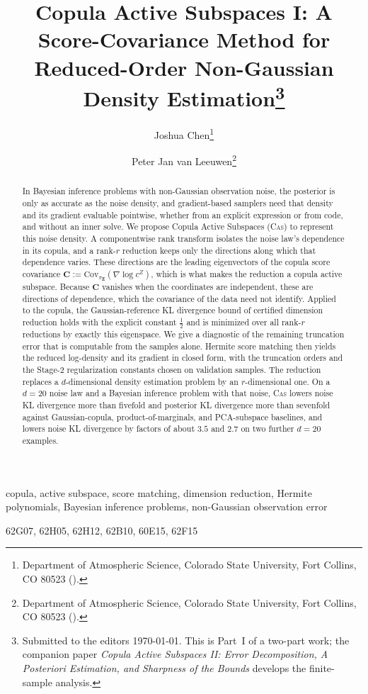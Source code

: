 \documentclass[review,hidelinks,onefignum,onetabnum]{siamart251216}
\title{Copula Active Subspaces I: A Score-Covariance Method for Reduced-Order Non-Gaussian Density Estimation\thanks{Submitted to the editors \today. This is Part~I of a two-part work; the companion paper \emph{Copula Active Subspaces II: Error Decomposition, A Posteriori Estimation, and Sharpness of the Bounds} develops the finite-sample analysis. \funding{This work was supported by the Consortium for Advanced Data Assimilation Research and Education (CADRE), funded by NOAA under grant 2007893.}}}
\author{%
  Joshua Chen\thanks{Department of Atmospheric Science, Colorado State University, Fort Collins, CO 80523 (\email{Joshua.Chen@colostate.edu}).}
  \and
  Peter Jan van Leeuwen\thanks{Department of Atmospheric Science, Colorado State University, Fort Collins, CO 80523 (\email{Peter.vanLeeuwen@colostate.edu}).}
}
\newcommand{\Cov}{\mathrm{Cov}}
\newcommand{\mC}{\bm{C}}
\newcommand{\vZ}{\bm{Z}}
\begin{document}
\maketitle

\begin{abstract}
In Bayesian inference problems with non-Gaussian observation noise, the posterior is only as accurate as the noise density, and gradient-based samplers need that density and its gradient evaluable pointwise, whether from an explicit expression or from code, and without an inner solve. We propose Copula Active Subspaces (\textsc{Cas}) to represent this noise density. A componentwise rank transform isolates the noise law's dependence in its copula, and a rank-$r$ reduction keeps only the directions along which that dependence varies. These directions are the leading eigenvectors of the copula score covariance $\mC := \Cov_{\pi_{\vZ}}(\nabla\log c^{Z})$, which is what makes the reduction a copula active subspace. Because $\mC$ vanishes when the coordinates are independent, these are directions of dependence, which the covariance of the data need not identify. Applied to the copula, the Gaussian-reference KL divergence bound of certified dimension reduction holds with the explicit constant $\tfrac12$ and is minimized over all rank-$r$ reductions by exactly this eigenspace. We give a diagnostic of the remaining truncation error that is computable from the samples alone. Hermite score matching then yields the reduced log-density and its gradient in closed form, with the truncation orders and the Stage-2 regularization constants chosen on validation samples. The reduction replaces a $d$-dimensional density estimation problem by an $r$-dimensional one. On a $d=20$ noise law and a Bayesian inference problem with that noise, \textsc{Cas} lowers noise KL divergence more than fivefold and posterior KL divergence more than sevenfold against Gaussian-copula, product-of-marginals, and PCA-subspace baselines, and lowers noise KL divergence by factors of about $3.5$ and $2.7$ on two further $d=20$ examples.
\end{abstract}

\begin{keywords}
copula, active subspace, score matching, dimension reduction, Hermite polynomials, Bayesian inference problems, non-Gaussian observation error
\end{keywords}

\begin{MSCcodes}
62G07, 62H05, 62H12, 62B10, 60E15, 62F15
\end{MSCcodes}
\end{document}
